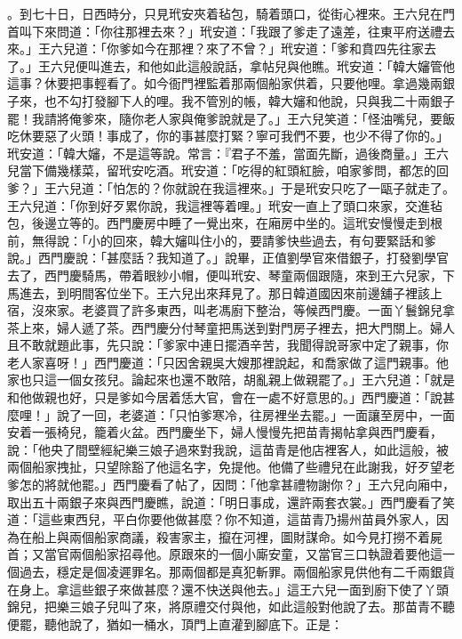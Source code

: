 。到七十日，日西時分，只見玳安夾着毡包，騎着頭口，從街心裡來。王六兒在門首叫下來問道：「你往那裡去來？」玳安道：「我跟了爹走了遠差，往東平府送禮去來。」王六兒道：「你爹如今在那裡？來了不曾？」玳安道：「爹和賁四先往家去了。」王六兒便叫進去，和他如此這般說話，拿帖兒與他瞧。玳安道：「韓大嬸管他這事？休要把事輕看了。如今衙門裡監着那兩個船家供着，只要他哩。拿過幾兩銀子來，也不勾打發腳下人的哩。我不管別的帳，韓大嬸和他說，只與我二十兩銀子罷！我請將俺爹來，隨你老人家與俺爹說就是了。」王六兒笑道：「怪油嘴兒，要飯吃休要惡了火頭！事成了，你的事甚麼打緊？寧可我們不要，也少不得了你的。」玳安道：「韓大嬸，不是這等說。常言：『君子不羞，當面先斷，過後商量。」王六兒當下備幾樣菜，留玳安吃酒。玳安道：「吃得的紅頭紅臉，咱家爹問，都怎的回爹？」王六兒道：「怕怎的？你就說在我這裡來。」于是玳安只吃了一甌子就走了。王六兒道：「你到好歹累你說，我這裡等着哩。」玳安一直上了頭口來家，交進毡包，後邊立等的。西門慶房中睡了一覺出來，在廂房中坐的。這玳安慢慢走到根前，無得說：「小的回來，韓大嬸叫住小的，要請爹快些過去，有句要緊話和爹說。」西門慶說：「甚麼話？我知道了。」說畢，正值劉學官來借銀子，打發劉學官去了，西門慶騎馬，帶着眼紗小帽，便叫玳安、琴童兩個跟隨，來到王六兒家，下馬進去，到明間客位坐下。王六兒出來拜見了。那日韓道國因來前邊舖子裡該上宿，沒來家。老婆買了許多東西，叫老馮廚下整治，等候西門慶。一面丫鬟錦兒拿茶上來，婦人遞了茶。西門慶分付琴童把馬送到對門房子裡去，把大門關上。婦人且不敢就題此事，先只說：「爹家中連日擺酒辛苦，我聞得說哥家中定了親事，你老人家喜呀！」西門慶道：「只因舍親吳大嫂那裡說起，和喬家做了這門親事。他家也只這一個女孩兒。論起來也還不敢陪，胡亂親上做親罷了。」王六兒道：「就是和他做親也好，只是爹如今居着恁大官，會在一處不好意思的。」西門慶道：「說甚麼哩！」說了一回，老婆道：「只怕爹寒冷，往房裡坐去罷。」一面讓至房中，一面安着一張椅兒，籠着火盆。西門慶坐下，婦人慢慢先把苗青揭帖拿與西門慶看，說：「他央了間壁經紀樂三娘子過來對我說，這苗青是他店裡客人，如此這般，被兩個船家拽扯，只望除豁了他這名字，免提他。他備了些禮兒在此謝我，好歹望老爹怎的將就他罷。」西門慶看了帖了，因問：「他拿甚禮物謝你？」王六兒向廂中，取出五十兩銀子來與西門慶瞧，說道：「明日事成，還許兩套衣裳。」西門慶看了笑道：「這些東西兒，平白你要他做甚麼？你不知道，這苗青乃揚州苗員外家人，因為在船上與兩個船家商議，殺害家主，攛在河裡，圖財謀命。如今見打撈不着屍首；又當官兩個船家招尋他。原跟來的一個小廝安童，又當官三口執證着要他這一個過去，穩定是個凌遲罪名。那兩個都是真犯斬罪。兩個船家見供他有二千兩銀貨在身上。拿這些銀子來做甚麼？還不快送與他去。」這王六兒一面到廚下使了丫頭錦兒，把樂三娘子兒叫了來，將原禮交付與他，如此這般對他說了去。那苗青不聽便罷，聽他說了，猶如一桶水，頂門上直灌到腳底下。正是：

